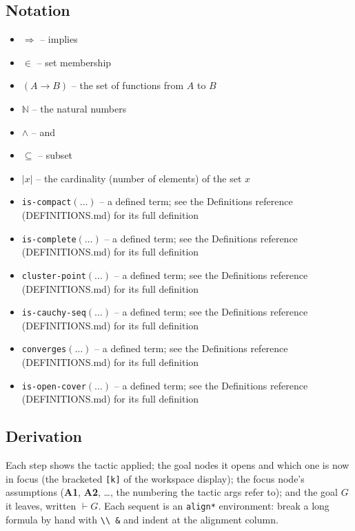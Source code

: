 \documentclass[11pt]{article}
\begin{document}
\subsection*{Notation}
\begin{itemize}
\item $\Rightarrow$ -- implies
\item $\in$ -- set membership
\item $(A \to B)$ -- the set of functions from $A$ to $B$
\item $\mathbb{N}$ -- the natural numbers
\item $\wedge$ -- and
\item $\subseteq$ -- subset
\item $|x|$ -- the cardinality (number of elements) of the set $x$
\item \texttt{is-compact}$(\ldots)$ -- a defined term; see the Definitions reference (DEFINITIONS.md) for its full definition
\item \texttt{is-complete}$(\ldots)$ -- a defined term; see the Definitions reference (DEFINITIONS.md) for its full definition
\item \texttt{cluster-point}$(\ldots)$ -- a defined term; see the Definitions reference (DEFINITIONS.md) for its full definition
\item \texttt{is-cauchy-seq}$(\ldots)$ -- a defined term; see the Definitions reference (DEFINITIONS.md) for its full definition
\item \texttt{converges}$(\ldots)$ -- a defined term; see the Definitions reference (DEFINITIONS.md) for its full definition
\item \texttt{is-open-cover}$(\ldots)$ -- a defined term; see the Definitions reference (DEFINITIONS.md) for its full definition
\end{itemize}

\subsection*{Derivation}
Each step shows the tactic applied; the goal nodes it opens and which one is now in focus (the bracketed \texttt{[k]} of the workspace display); the focus node's assumptions (\textbf{A1}, \textbf{A2}, \dots{}, the numbering the tactic args refer to); and the goal $G$ it leaves, written $\vdash G$.  Each sequent is an \texttt{align*} environment: break a long formula by hand with \texttt{\textbackslash\textbackslash\ \&} and indent at the alignment column.
\end{document}
